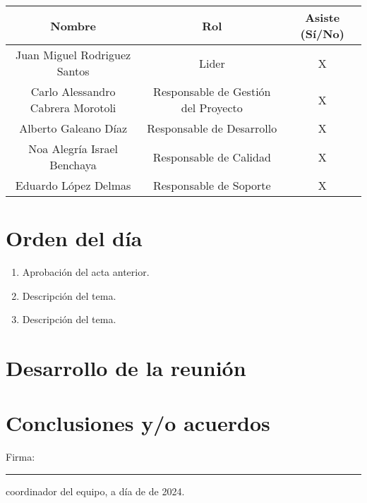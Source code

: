 \documentclass[titlepage,a4paper]{article}
\begin{document}
\begin{tabular}{ | c | c | c | }
    \hline
    Nombre & Rol & Asiste (Sí/No) \\ \hline
    Juan Miguel Rodriguez Santos & Lider & X \\ \hline
    Carlo Alessandro Cabrera Morotoli & Responsable de Gestión del Proyecto & X \\ \hline
    Alberto Galeano Díaz & Responsable de Desarrollo & X \\ \hline
    Noa Alegría Israel Benchaya & Responsable de Calidad & X \\ \hline
    Eduardo López Delmas & Responsable de Soporte & X \\ \hline
\end{tabular}

\section{Orden del día }\label{sec:diagramasdeclase}

\begin{enumerate}[label=\arabic*.]
    \item Aprobación del acta anterior.
    \item Descripción del tema.
    \item Descripción del tema.
\end{enumerate}

\section{Desarrollo de la reunión}

\section{Conclusiones y/o acuerdos}


\vspace{2cm} %
\noindent
Firma: \rule{5cm}{0.4pt} coordinador del equipo, a día \underline{\hspace{1cm}} de \underline{\hspace{1cm}} de 2024. %
\end{document}
